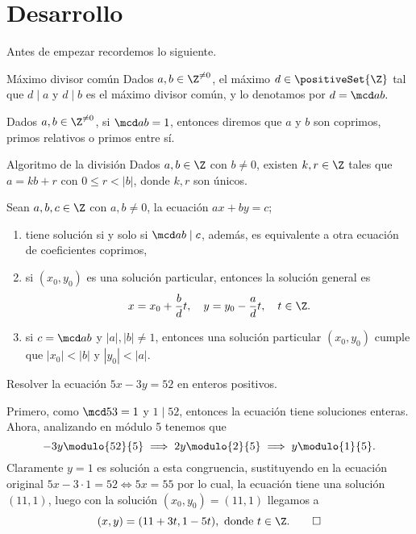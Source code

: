 \section{Desarrollo}
Antes de empezar recordemos lo siguiente.

\begin{definition.box}{Máximo divisor común}{}
    Dados $a,b \in \Z^{\neq 0}$, el máximo $d \in \positiveSet{\Z}$ tal que $d \mid a$ y $d \mid b$ es el máximo divisor común,
    y lo denotamos por $d = \mcd a b.$
\end{definition.box}

\begin{definition.box}{}{}
    Dados $a,b \in \Z^{\neq 0}$, si $\mcd a b = 1$, entonces diremos que $a$ y $b$ son coprimos, primos relativos o primos entre sí.
\end{definition.box}

\begin{theorem.box}{Algoritmo de la división}{}
    Dados $a, b \in \Z$ con $b \neq 0$, existen $k,r \in \Z$ tales que $a = kb + r$ con $0 \leq r < |b|$, donde $k,r$ son únicos.
\end{theorem.box}

\begin{theorem.box}{}{}
Sean $a,b,c \in \Z$ con $a,b \neq 0$, la ecuación $ax + by = c$;
\begin{enumerate}
    \item tiene solución si y solo si $\mcd a b \mid c$, además, es equivalente a otra ecuación de coeficientes coprimos,
    \item si $(x_0,y_0)$ es una solución particular, entonces la solución general es
    \[
        x = x_0+\frac{b}{d}t, \quad y = y_0 -\frac{a}{d}t, \quad t \in \Z.
    \]
    \item si $c = \mcd a b$ y $|a|, |b| \neq 1$, entonces una solución particular $(x_0,y_0)$ cumple que $|x_0| < |b|$ y $|y_0| < |a|$.
\end{enumerate}
\end{theorem.box}

\begin{example}
    Resolver la ecuación $5x - 3y = 52$ en enteros positivos.
\end{example}
\begin{solution}
    Primero, como $\mcd 5 3 = 1$ y $1 \mid 52$, entonces la ecuación tiene soluciones enteras.
    Ahora, analizando en módulo 5 tenemos que
    \[
        - 3y \modulo{52}{5} \implies 2y \modulo{2}{5} \implies y \modulo{1}{5}.
    \]
    Claramente $y = 1$ es solución a esta congruencia, sustituyendo en la ecuación original $5x - 3\cdot 1 = 52 \iff 5x = 55$
    por lo cual, la ecuación tiene una solución $(11, 1)$, luego con la solución $(x_0,y_0)=(11,1)$ llegamos a
    \[
        (x,y) = (11+3t,1-5t), \mbox{ donde } t\in \Z.\qedhere
    \]
\end{solution}

